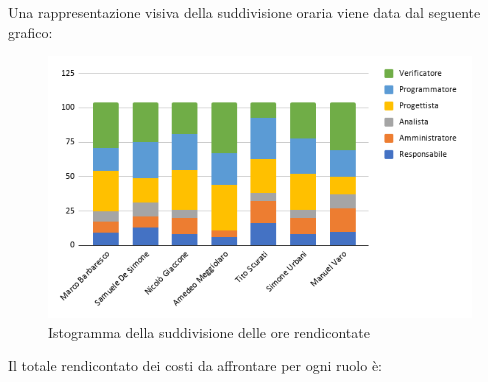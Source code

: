 \pagebreak
Una rappresentazione visiva della suddivisione oraria viene data dal seguente grafico:
\begin{figure}[!h]
    \vspace{5px}
    \includegraphics[scale=0.6]{../../../Images/Diagrammi/Istogrammi/ore rendicontate.png}
    \centering
    \caption{Istogramma della suddivisione delle ore rendicontate}
\end{figure}

Il totale rendicontato dei costi da affrontare per ogni ruolo è:

